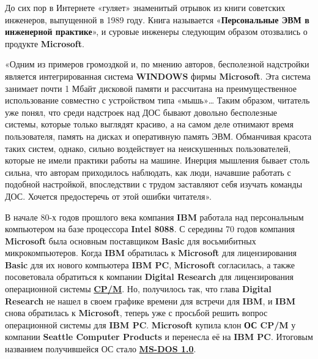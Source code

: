 \documentclass[14pt, a4paper]{article}
\begin{document}
До сих пор в Интернете «гуляет» знаменитый отрывок из книги советских инженеров,
выпущенной в 1989 году. Книга называется «\textbf{Персональные ЭВМ в инженерной практике}»,
и суровые инженеры следующим образом отозвались о продукте \textbf{Microsoft}.


«Одним из примеров громоздкой и, по мнению авторов, бесполезной надстройки является интегрированная система \textbf{WINDOWS} фирмы \textbf{Microsoft}.
Эта система занимает почти 1 Мбайт дисковой памяти и рассчитана на преимущественное использование совместно с устройством типа «мышь»…
Таким образом, читатель уже понял, что среди надстроек над ДОС бывают довольно бесполезные системы, которые только выглядят красиво,
а на самом деле отнимают время пользователя, память на дисках и оперативную память ЭВМ. Обманчивая красота таких систем, однако, сильно воздействует на неискушенных пользователей,
которые не имели практики работы на машине. Инерция мышления бывает столь сильна, что авторам приходилось наблюдать, как люди, начавшие работать с подобной настройкой,
впоследствии с трудом заставляют себя изучать команды ДОС. Хочется предостеречь от этой ошибки читателя».


В начале 80-х годов прошлого века компания \textbf{IBM} работала над персональным компьютером на базе процессора \textbf{Intel 8088}.
С середины 70 годов компания \textbf{Microsoft} была основным поставщиком \textbf{Basic} для восьмибитных микрокомпьютеров.
Когда \textbf{IBM} обратилась к \textbf{Microsoft} для лицензирования \textbf{Basic} для их нового компьютера \textbf{IBM PC}, \textbf{Microsoft} согласилась,
а также посоветовала обратиться к компании \textbf{Digital Research} для лицензирования операционной системы \textbf{\underline{CP/M}}.
Но, получилось так, что глава \textbf{Digital Research} не нашел в своем графике времени для встречи для \textbf{IBM},
и \textbf{IBM} снова обратилась к \textbf{Microsoft}, теперь уже с просьбой решить вопрос операционной системы для \textbf{IBM PC}.
\textbf{Microsoft} купила клон \textbf{ОС CP/M} у компании \textbf{Seattle Computer Products} и перенесла её на \textbf{IBM PC}.
Итоговым названием получившейся ОС стало \textbf{\underline{MS-DOS 1.0}}.
\end{document}
